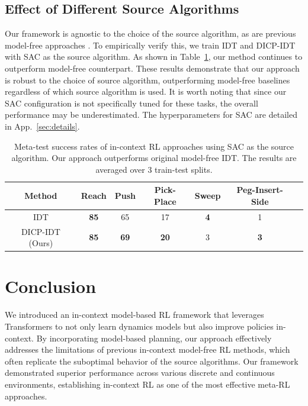 \documentclass{article}
\begin{document}
\subsection{Effect of Different Source Algorithms}
\label{sec:ablation:source}

Our framework is agnostic to the choice of the source algorithm, as are previous model-free approaches \citep{AD, DPT, IDT}.
To empirically verify this, we train IDT and DICP-IDT with SAC \citep{SAC} as the source algorithm.
As shown in Table~\ref{tab:ablation-source}, our method continues to outperform model-free counterpart.
These results demonstrate that our approach is robust to the choice of source algorithm, outperforming model-free baselines regardless of which source algorithm is used.
It is worth noting that since our SAC configuration is not specifically tuned for these tasks, the overall performance may be underestimated.
The hyperparameters for SAC are detailed in App.~\ref{sec:details}.


\begin{table}[t!]
    \caption{Meta-test success rates of in-context RL approaches using SAC as the source algorithm.
    Our approach outperforms original model-free IDT.
    The results are averaged over 3 train-test splits.
    }
    \label{tab:ablation-source}
    \small \centering
    \begin{tabular}{ccccccc}
    \toprule
    Method & Reach & Push & Pick-Place & Sweep & Peg-Insert-Side\\
    \midrule
    IDT & \textbf{85} & 65 & 17 & \textbf{4} & 1\\
    DICP-IDT (Ours) & \textbf{85} & \textbf{69} & \textbf{20} & 3 & \textbf{3}\\
    \bottomrule
    \end{tabular}
\end{table}

\section{Conclusion}
\label{sec:conc}

We introduced an in-context model-based RL framework that leverages Transformers to not only learn dynamics models but also improve policies in-context.
By incorporating model-based planning, our approach effectively addresses the limitations of previous in-context model-free RL methods, which often replicate the suboptimal behavior of the source algorithms.
Our framework demonstrated superior performance across various discrete and continuous environments, establishing in-context RL as one of the most effective meta-RL approaches.
\end{document}
